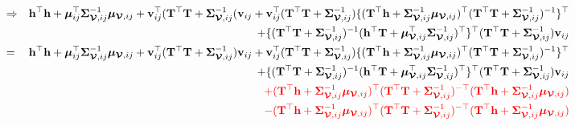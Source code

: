 \documentclass[12pt]{article}
\newcommand{\0}{\mathbf{0}}
\begin{document}
\begin{eqnarray*}
& \Rightarrow & \mathbf{h}^{\top} \mathbf{h} + \boldsymbol{\mu}_{ij}^{\top} \boldsymbol{\Sigma}_{\boldsymbol{\mathcal{V}}, ij}^{-1} \boldsymbol{\mu}_{\boldsymbol{\mathcal{V}}, ij} + \mathbf{v}_{ij}^{\top} ( \mathbf{T}^{\top} \mathbf{T} + \boldsymbol{\Sigma}_{\boldsymbol{\mathcal{V}}, ij}^{-1} ( \mathbf{v}_{ij} + \mathbf{v}_{ij}^{\top} ( \mathbf{T}^{\top} \mathbf{T} + \boldsymbol{\Sigma}_{\boldsymbol{\mathcal{V}}, ij}^{-1} ) \{ (\mathbf{T}^{\top} \mathbf{h} + \boldsymbol{\Sigma}_{\boldsymbol{\mathcal{V}}, ij}^{-1}\boldsymbol{\mu}_{\boldsymbol{\mathcal{V}}, ij} )^{\top} ( \mathbf{T}^{\top} \mathbf{T} + \boldsymbol{\Sigma}_{\boldsymbol{\mathcal{V}}, ij}^{-1} )^{-1} \}^{\top} \\
&& + \{ ( \mathbf{T}^{\top} \mathbf{T} + \boldsymbol{\Sigma}_{\boldsymbol{\mathcal{V}}, ij}^{-1} )^{-1} ( \mathbf{h}^{\top} \mathbf{T} + \boldsymbol{\mu}_{\boldsymbol{\mathcal{V}}, ij}^{\top} \boldsymbol{\Sigma}_{\boldsymbol{\mathcal{V}}, ij}^{-1})^{\top} \}^{\top} ( \mathbf{T}^{\top} \mathbf{T} + \boldsymbol{\Sigma}_{\boldsymbol{\mathcal{V}}, ij}^{-1} ) \mathbf{v}_{ij} \\
& = & \mathbf{h}^{\top} \mathbf{h} + \boldsymbol{\mu}_{ij}^{\top} \boldsymbol{\Sigma}_{\boldsymbol{\mathcal{V}}, ij}^{-1} \boldsymbol{\mu}_{\boldsymbol{\mathcal{V}}, ij} + \mathbf{v}_{ij}^{\top} ( \mathbf{T}^{\top} \mathbf{T} + \boldsymbol{\Sigma}_{\boldsymbol{\mathcal{V}}, ij}^{-1} ) \mathbf{v}_{ij} + \mathbf{v}_{ij}^{\top} ( \mathbf{T}^{\top} \mathbf{T} + \boldsymbol{\Sigma}_{\boldsymbol{\mathcal{V}}, ij}^{-1} ) \{ (\mathbf{T}^{\top} \mathbf{h} + \boldsymbol{\Sigma}_{\boldsymbol{\mathcal{V}}, ij}^{-1}\boldsymbol{\mu}_{\boldsymbol{\mathcal{V}}, ij} )^{\top} ( \mathbf{T}^{\top} \mathbf{T} + \boldsymbol{\Sigma}_{\boldsymbol{\mathcal{V}}, ij}^{-1} )^{-1} \}^{\top} \\
&& + \{ ( \mathbf{T}^{\top} \mathbf{T} + \boldsymbol{\Sigma}_{\boldsymbol{\mathcal{V}}, ij}^{-1} )^{-1} ( \mathbf{h}^{\top} \mathbf{T} + \boldsymbol{\mu}_{\boldsymbol{\mathcal{V}}, ij}^{\top} \boldsymbol{\Sigma}_{\boldsymbol{\mathcal{V}}, ij}^{-1})^{\top} \}^{\top} ( \mathbf{T}^{\top} \mathbf{T} + \boldsymbol{\Sigma}_{\boldsymbol{\mathcal{V}}, ij}^{-1} ) \mathbf{v}_{ij} \\
&& \textcolor{red}{+ ( \mathbf{T}^{\top} \mathbf{h} + \boldsymbol{\Sigma}_{\boldsymbol{\mathcal{V}}, ij}^{-1}\boldsymbol{\mu}_{\boldsymbol{\mathcal{V}}, ij} )^{\top}   ( \mathbf{T}^{\top} \mathbf{T} + \boldsymbol{\Sigma}_{\boldsymbol{\mathcal{V}}, ij}^{-1} )^{-\top}     ( \mathbf{T}^{\top} \mathbf{h} + \boldsymbol{\Sigma}_{\boldsymbol{\mathcal{V}}, ij}^{-1}\boldsymbol{\mu}_{\boldsymbol{\mathcal{V}}, ij} )} \\
&& \textcolor{red}{- ( \mathbf{T}^{\top} \mathbf{h} + \boldsymbol{\Sigma}_{\boldsymbol{\mathcal{V}}, ij}^{-1}\boldsymbol{\mu}_{\boldsymbol{\mathcal{V}}, ij} )^{\top} ( \mathbf{T}^{\top} \mathbf{T} + \boldsymbol{\Sigma}_{\boldsymbol{\mathcal{V}}, ij}^{-1} )^{-\top}  ( \mathbf{T}^{\top} \mathbf{h} + \boldsymbol{\Sigma}_{\boldsymbol{\mathcal{V}}, ij}^{-1}\boldsymbol{\mu}_{\boldsymbol{\mathcal{V}}, ij} )}
\end{eqnarray*}
\end{document}

